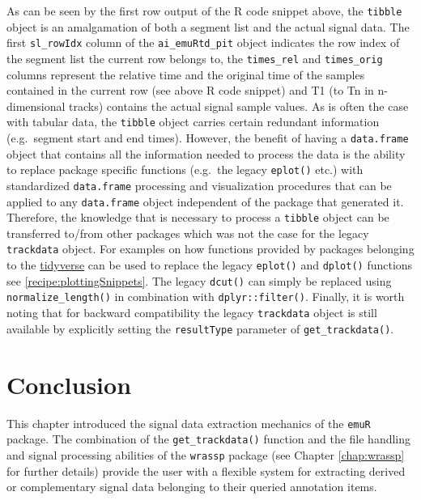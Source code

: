 \documentclass[]{book}
\begin{document}
As can be seen by the first row output of the R code snippet above, the \texttt{tibble} object is an amalgamation of both a segment list and the actual signal data. The first \texttt{sl\_rowIdx} column of the \texttt{ai\_emuRtd\_pit} object indicates the row index of the segment list the current row belongs to, the \texttt{times\_rel} and \texttt{times\_orig} columns represent the relative time and the original time of the samples contained in the current row (see above R code snippet) and T1 (to Tn in n-dimensional tracks) contains the actual signal sample values. As is often the case with tabular data, the \texttt{tibble} object carries certain redundant information (e.g.~segment start and end times). However, the benefit of having a \texttt{data.frame} object that contains all the information needed to process the data is the ability to replace package specific functions (e.g.~the legacy \texttt{eplot()} etc.) with standardized \texttt{data.frame} processing and visualization procedures that can be applied to any \texttt{data.frame} object independent of the package that generated it. Therefore, the knowledge that is necessary to process a \texttt{tibble} object can be transferred to/from other packages which was not the case for the legacy \texttt{trackdata} object. For examples on how functions provided by packages belonging to the \href{https://www.tidyverse.org/}{tidyverse} can be used to replace the legacy \texttt{eplot()} and \texttt{dplot()} functions see \ref{recipe:plottingSnippets}. The legacy \texttt{dcut()} can simply be replaced using \texttt{normalize\_length()} in combination with \texttt{dplyr::filter()}. Finally, it is worth noting that for backward compatibility the legacy \texttt{trackdata} object is still available by explicitly setting the \texttt{resultType} parameter of \texttt{get\_trackdata()}.

\hypertarget{conclusion-3}{%
\section{Conclusion}\label{conclusion-3}}

This chapter introduced the signal data extraction mechanics of the \texttt{emuR} package. The combination of the \texttt{get\_trackdata()} function and the file handling and signal processing abilities of the \texttt{wrassp} package (see Chapter \ref{chap:wrassp} for further details) provide the user with a flexible system for extracting derived or complementary signal data belonging to their queried annotation items.
\end{document}
